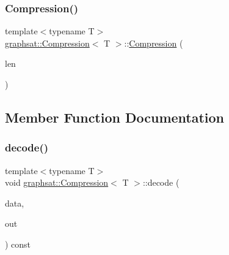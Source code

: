 \mbox{\label{classgraphsat_1_1_compression_a05cf60de010437871e6a649398377380}} 
\subsubsection{\texorpdfstring{Compression()}{Compression()}\hspace{0.1cm}{\footnotesize\ttfamily [2/2]}}
{\footnotesize\ttfamily template$<$typename T$>$ \\
\mbox{\hyperlink{classgraphsat_1_1_compression}{graphsat\+::\+Compression}}$<$ T $>$\+::\mbox{\hyperlink{classgraphsat_1_1_compression}{Compression}} (\begin{DoxyParamCaption}\item[{int}]{len }\end{DoxyParamCaption})\hspace{0.3cm}{\ttfamily [inline]}}



\subsection{Member Function Documentation}
\mbox{\label{classgraphsat_1_1_compression_a76b8dd8b2673ed317f179e145685e861}} 
\subsubsection{\texorpdfstring{decode()}{decode()}}
{\footnotesize\ttfamily template$<$typename T$>$ \\
void \mbox{\hyperlink{classgraphsat_1_1_compression}{graphsat\+::\+Compression}}$<$ T $>$\+::decode (\begin{DoxyParamCaption}\item[{const \mbox{\hyperlink{namespacegraphsat_aa3b3d61a8c27ffc03448c5e1f3a76aed}{U\+I\+NT}} $\ast$const}]{data,  }\item[{T $\ast$}]{out }\end{DoxyParamCaption}) const\hspace{0.3cm}{\ttfamily [inline]}}

